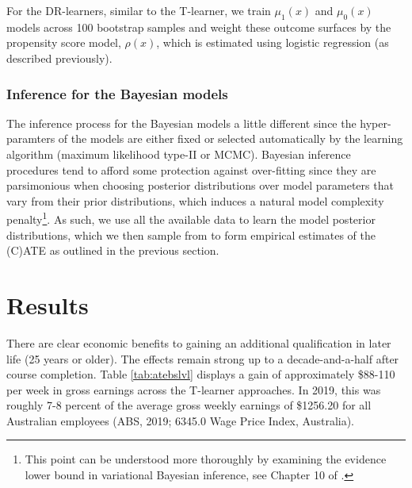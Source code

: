 \documentclass[12pt, a4paper]{article}
\begin{document}

For the DR-learners, similar to the T-learner, we train $\mu_1(x)$ and
$\mu_0(x)$ models across 100 bootstrap samples and weight these outcome
surfaces by the propensity score model, $\rho(x)$, which is estimated using
logistic regression (as described previously). 

\subsubsection*{Inference for the Bayesian models}

The inference process for the Bayesian models a little different since the
hyper-paramters of the models are either fixed or selected automatically by the
learning algorithm (maximum likelihood type-II or MCMC). Bayesian inference
procedures tend to afford some protection against over-fitting since they are
parsimonious when choosing posterior distributions over model parameters that
vary from their prior distributions, which induces a natural model complexity
penalty\footnote{This point can be understood more thoroughly by examining the
evidence lower bound in variational Bayesian inference, see Chapter 10 of
\citet{bishop2006}.}. As such, we use all the available data to learn the model
posterior distributions, which we then sample from to form empirical estimates
of the (C)ATE as outlined in the previous section. 


\section{Results}

There are clear economic benefits to gaining an additional qualification in later life (25 years or older). The effects remain strong up to a decade-and-a-half after course completion. Table \ref{tab:atebslvl} displays a gain of approximately \$88-110 per week in gross earnings across the T-learner approaches. In 2019, this was roughly 7-8 percent of the average gross weekly earnings of \$1256.20 for all Australian employees (ABS, 2019; 6345.0 Wage Price Index, Australia). 
\end{document}
